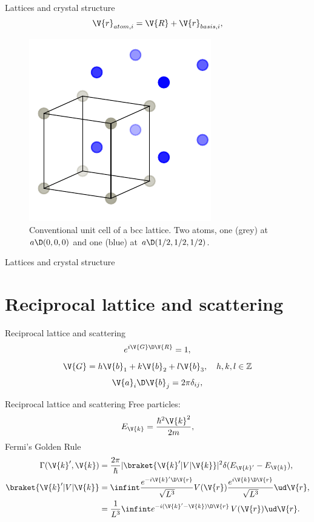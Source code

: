 \documentclass{beamer}
\begin{document}
\begin{frame}{Lattices and crystal structure}
\begin{equation*}
	\V{r}_{atom,i} = \V{R} + \V{r}_{basis, i},
\end{equation*}
\begin{figure}[H]
	\centering
	\includegraphics{figures/lattice_unfinished_1.pdf}
	\caption{Conventional unit cell of a bcc lattice. Two atoms, one (grey) at $ a \D (0,0,0) $ and one (blue) at $ a\D(1/2, 1/2, 1/2) $.}
\end{figure}
\end{frame}


\begin{frame}{Lattices and crystal structure}
\end{frame}



\section{Reciprocal lattice and scattering}
\begin{frame}{Reciprocal lattice and scattering}
\begin{equation*}
	e^{i \V{G} \D\V{R}} = 1,
\end{equation*}
\begin{equation*}
	\V{G} = h \V{b}_1 + k\V{b}_2 + l\V{b}_3, \quad h,k,l \in \mathbb{Z}
\end{equation*}
\begin{equation*}
	\V{a}_i \D \V{b}_j = 2\pi \delta_{ij},
\end{equation*}
\end{frame}


\begin{frame}{Reciprocal lattice and scattering}
Free particles:
\begin{equation*}
	E_{\V{k}} = \frac{\hbar^2 \V{k}^2}{2m},
\end{equation*}
Fermi's Golden Rule
\begin{align*}
	\Gamma(\V{k}', \V{k}) &= \frac{2\pi}{\hbar}|\braket{\V{k}' | V | \V{k}}|^2 \delta(E_{\V{k}'}-E_{\V{k}}), \\
	\braket{\V{k}' | V | \V{k}} &= \infint \frac{e^{-i \V{k}'\D\V{r}}}{\sqrt{L^3}} V(\V{r}) \frac{e^{i \V{k}\D\V{r}}}{\sqrt{L^3}} \ud \V{r}, \\
	&= \frac{1}{L^3} \infint e^{-i(\V{k}'-\V{k}) \D \V{r}} \, V(\V{r}) \ud \V{r}.
\end{align*}
\end{frame}
\end{document}
